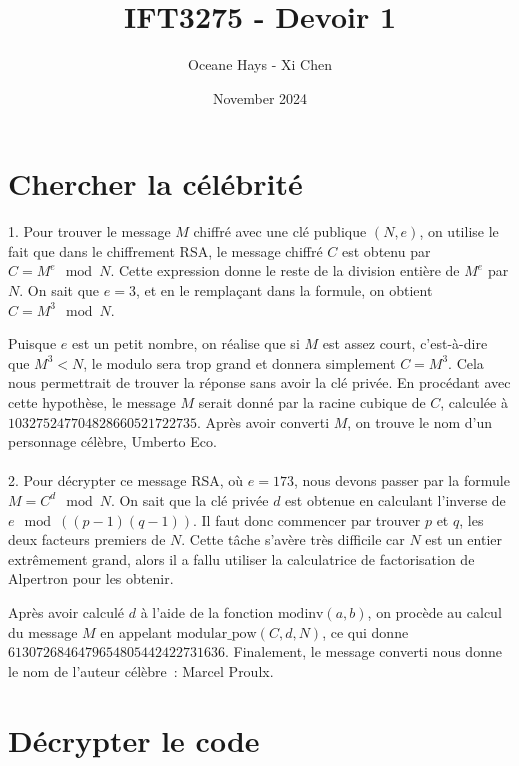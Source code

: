 \documentclass{article}
\title{IFT3275 - Devoir 1}
\author{Oceane Hays - Xi Chen}
\date{November 2024}
\begin{document}
\maketitle

\section{Chercher la célébrité}
1. Pour trouver le message \( M \) chiffré avec une clé publique \( (N, e) \), on utilise le fait que dans le chiffrement RSA, le message chiffré \( C \) est obtenu par \( C = M^e \mod N \). Cette expression donne le reste de la division entière de \( M^e \) par \( N \). On sait que \( e = 3 \), et en le remplaçant dans la formule, on obtient \( C = M^3 \mod N \).

Puisque \( e \) est un petit nombre, on réalise que si \( M \) est assez court, c'est-à-dire que \( M^3 < N \), le modulo sera trop grand et donnera simplement \( C = M^3 \). Cela nous permettrait de trouver la réponse sans avoir la clé privée. En procédant avec cette hypothèse, le message \( M \) serait donné par la racine cubique de \( C \), calculée à \( 103275247704828660521722735 \). Après avoir converti \( M \), on trouve le nom d'un personnage célèbre, Umberto Eco. 
\\
\\

2. Pour décrypter ce message RSA, où \( e = 173 \), nous devons passer par la formule \( M = C^d \mod N \). On sait que la clé privée \( d \) est obtenue en calculant l'inverse de \( e \mod ((p-1)(q-1)) \). Il faut donc commencer par trouver \( p \) et \( q \), les deux facteurs premiers de \( N \). Cette tâche s'avère très difficile car \( N \) est un entier extrêmement grand, alors il a fallu utiliser la calculatrice de factorisation de Alpertron pour les obtenir.

Après avoir calculé \( d \) à l'aide de la fonction \( \text{modinv}(a, b) \), on procède au calcul du message \( M \) en appelant \( \text{modular\_pow}(C, d, N) \), ce qui donne \( 6130726846479654805442422731636 \). Finalement, le message converti nous donne le nom de l'auteur célèbre : Marcel Proulx.

\section{Décrypter le code}
\end{document}
